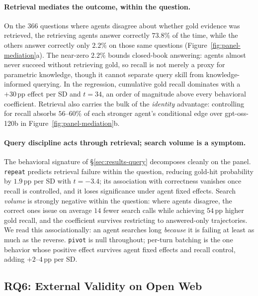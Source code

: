 \paragraph{Retrieval mediates the outcome, within the question.} On the $366$ questions where agents disagree about whether gold evidence was retrieved, the retrieving agents answer correctly $73.8\%$ of the time, while the others answer correctly only $2.2\%$ on those same questions (Figure~\ref{fig:panel-mediation}a). The near-zero $2.2\%$ bounds closed-book answering: agents almost never succeed without retrieving gold, so recall is not merely a proxy for parametric knowledge, though it cannot separate query skill from knowledge-informed querying. In the regression, cumulative gold recall dominates with a $+30$\,pp effect per SD and $t = 34$, an order of magnitude above every behavioral coefficient. Retrieval also carries the bulk of the \emph{identity} advantage: controlling for recall absorbs $56\text{--}60\%$ of each stronger agent's conditional edge over gpt-oss-120b in Figure~\ref{fig:panel-mediation}b.

\paragraph{Query discipline acts through retrieval; search volume is a symptom.} The behavioral signature of §\ref{sec:results-query} decomposes cleanly on the panel. \texttt{repeat} predicts retrieval failure within the question, reducing gold-hit probability by $1.9$\,pp per SD with $t = -3.4$; its association with correctness vanishes once recall is controlled, and it loses significance under agent fixed effects. Search \emph{volume} is strongly negative within the question: where agents disagree, the correct ones issue on average $14$ fewer search calls while achieving $54$\,pp higher gold recall, and the coefficient survives restricting to answered-only trajectories. We read this associationally: an agent searches long \emph{because} it is failing at least as much as the reverse. \texttt{pivot} is null throughout; per-turn batching is the one behavior whose positive effect survives agent fixed effects and recall control, adding $+2\text{--}4$\,pp per SD.

\subsection{RQ6: External Validity on Open Web}
\label{sec:results-openweb}

